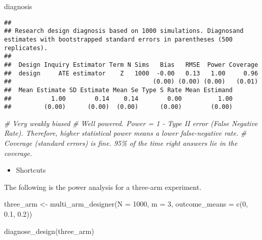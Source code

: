 \documentclass[
]{book}
\newenvironment{Shaded}{\begin{snugshade}}{\end{snugshade}}
\newcommand{\AttributeTok}[1]{\textcolor[rgb]{0.77,0.63,0.00}{#1}}
\newcommand{\CommentTok}[1]{\textcolor[rgb]{0.56,0.35,0.01}{\textit{#1}}}
\newcommand{\DecValTok}[1]{\textcolor[rgb]{0.00,0.00,0.81}{#1}}
\newcommand{\FloatTok}[1]{\textcolor[rgb]{0.00,0.00,0.81}{#1}}
\newcommand{\FunctionTok}[1]{\textcolor[rgb]{0.00,0.00,0.00}{#1}}
\newcommand{\NormalTok}[1]{#1}
\newcommand{\OtherTok}[1]{\textcolor[rgb]{0.56,0.35,0.01}{#1}}
\providecommand{\tightlist}{%
  \setlength{\itemsep}{0pt}\setlength{\parskip}{0pt}}
\begin{document}
\begin{Shaded}
\begin{Highlighting}[]
\NormalTok{diagnosis}
\end{Highlighting}
\end{Shaded}

\begin{verbatim}
## 
## Research design diagnosis based on 1000 simulations. Diagnosand estimates with bootstrapped standard errors in parentheses (500 replicates).
## 
##  Design Inquiry Estimator Term N Sims   Bias   RMSE  Power Coverage
##  design     ATE estimator    Z   1000  -0.00   0.13   1.00     0.96
##                                       (0.00) (0.00) (0.00)   (0.01)
##  Mean Estimate SD Estimate Mean Se Type S Rate Mean Estimand
##           1.00        0.14    0.14        0.00          1.00
##         (0.00)      (0.00)  (0.00)      (0.00)        (0.00)
\end{verbatim}

\begin{Shaded}
\begin{Highlighting}[]
\CommentTok{\# Very weakly biased }
\CommentTok{\# Well powered. Power = 1 {-} Type II error (False Negative Rate). Therefore, higher statistical power means a lower false{-}negative rate. }
\CommentTok{\# Coverage (standard errors) is fine. 95\% of the time right answers lie in the coverage. }
\end{Highlighting}
\end{Shaded}

\begin{itemize}
\tightlist
\item
  Shortcuts
\end{itemize}

The following is the power analysis for a three-arm experiment.

\begin{Shaded}
\begin{Highlighting}[]
\NormalTok{three\_arm }\OtherTok{\textless{}{-}} \FunctionTok{multi\_arm\_designer}\NormalTok{(}\AttributeTok{N =} \DecValTok{1000}\NormalTok{, }\AttributeTok{m =} \DecValTok{3}\NormalTok{, }
                   \AttributeTok{outcome\_means =} \FunctionTok{c}\NormalTok{(}\DecValTok{0}\NormalTok{, }\FloatTok{0.1}\NormalTok{, }\FloatTok{0.2}\NormalTok{))}

\FunctionTok{diagnose\_design}\NormalTok{(three\_arm)}
\end{Highlighting}
\end{Shaded}
\end{document}
